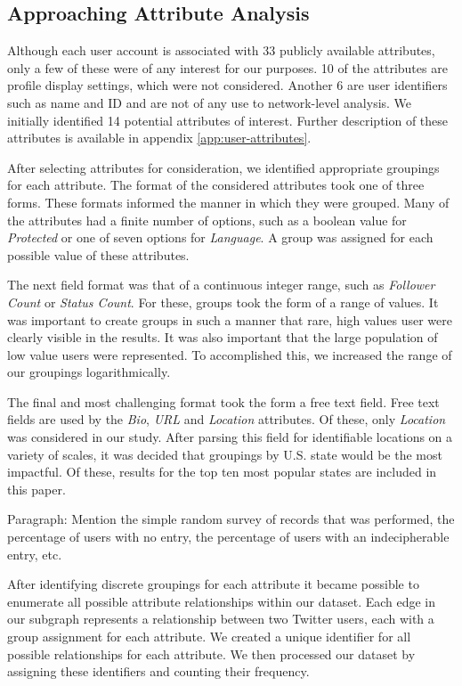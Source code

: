 \subsection{Approaching Attribute Analysis}

Although each user account is associated with 33 publicly available attributes, only a few of these were of any interest for our purposes.  10 of the attributes are profile display settings, which were not considered.  Another 6 are user identifiers such as name and ID and are not of any use to network-level analysis.  We initially identified 14 potential attributes of interest.  Further description of these attributes is available in appendix \ref{app:user-attributes}.

After selecting attributes for consideration, we identified appropriate groupings for each attribute.  The format of the considered attributes took one of three forms.  These formats informed the manner in which they were grouped.  Many of the attributes had a finite number of options, such as a boolean value for \textit{Protected} or one of seven options for \textit{Language}.  A group was assigned for each possible value of these attributes.

The next field format was that of a continuous integer range, such as \textit{Follower Count} or \textit{Status Count}.  For these, groups took the form of a range of values.  It was important to create groups in such a manner that rare, high values user were clearly visible in the results.  It was also important that the large population of low value users were represented.  To accomplished this, we increased the range of our groupings logarithmically.

The final and most challenging format took the form a free text field.  Free text fields are used by the \textit{Bio}, \textit{URL} and \textit{Location} attributes.  Of these, only \textit{Location} was considered in our study.  After parsing this field for identifiable locations  on a variety of scales, it was decided that groupings by U.S. state would be the most impactful.  Of these, results for the top ten most popular states are included in this paper.

Paragraph: Mention the simple random survey of records that was performed, the percentage of users with no entry, the percentage of users with an indecipherable entry, etc.

After identifying discrete groupings for each attribute it became possible to enumerate all possible attribute relationships within our dataset.  Each edge in our subgraph represents a relationship between two Twitter users, each with a group assignment for each attribute.  We created a unique identifier for all possible relationships for each attribute.  We then processed our dataset by assigning these identifiers and counting their frequency.

